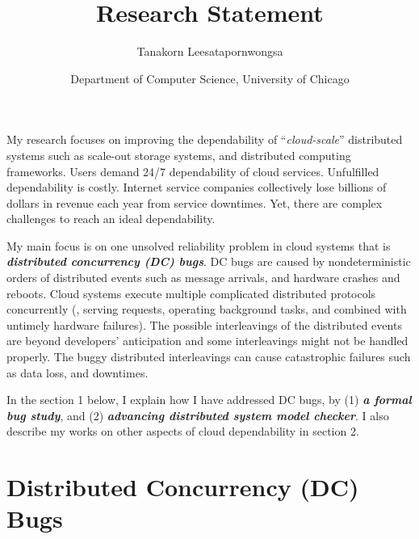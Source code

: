 \documentclass[11pt]{article}
\begin{document}
\title{Research Statement}
\author{Tanakorn Leesatapornwongsa}
\date{\vspace{-1ex} \small{Department of Computer Science, University of
Chicago}}

\maketitle

My research focuses on improving the dependability of ``\textit{cloud-scale}''
distributed systems such as scale-out storage systems, and distributed computing
frameworks. Users demand 24/7 dependability of
cloud services. Unfulfilled dependability is costly. Internet service companies
collectively lose billions of dollars in revenue each year from service
downtimes. Yet, there are complex challenges to reach an ideal dependability. 

My main focus is on one unsolved reliability problem in cloud systems that is
\textbf{\textit{distributed concurrency (DC) bugs}}. DC bugs are caused by
nondeterministic orders of distributed events such as message arrivals, and
hardware crashes and reboots. Cloud systems execute multiple complicated
distributed protocols concurrently (\eg, serving requests, operating
background tasks, and combined with untimely hardware failures). The possible
interleavings of the distributed events are beyond developers' anticipation and
some interleavings might not be handled properly. The buggy distributed
interleavings can cause catastrophic failures such as data loss, and downtimes.

In the section 1 below, I explain how I have addressed DC bugs, by (1)
\textit{\textbf{a formal bug study}}, and (2) \textit{\textbf{advancing
distributed system model checker}}. I also describe my works on other aspects
of cloud dependability in section 2.


\section{Distributed Concurrency (DC) Bugs}\label{dcbugs}

\end{document}
